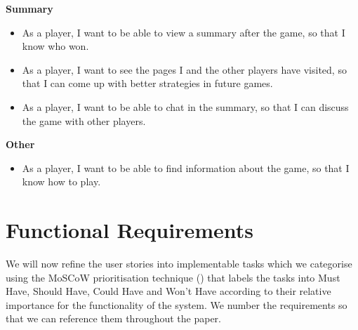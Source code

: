 \documentclass{l4proj}
\begin{document}
\textbf{Summary}
\begin{itemize}
    \item As a player, I want to be able to view a summary after the game, so that I know who won.
    \item As a player, I want to see the pages I and the other players have visited, so that I can come up with better strategies in future games.
    \item As a player, I want to be able to chat in the summary, so that I can discuss the game with other players.
\end{itemize}

\textbf{Other}
\begin{itemize}
    \item As a player, I want to be able to find information about the game, so that I know how to play.
\end{itemize}

\section{Functional Requirements}
We will now refine the user stories into implementable tasks which we categorise using the MoSCoW prioritisation technique (\cite{moscow}) that labels the tasks into Must Have, Should Have, Could Have and Won't Have according to their relative importance for the functionality of the system. We number the requirements so that we can reference them throughout the paper.
\end{document}
